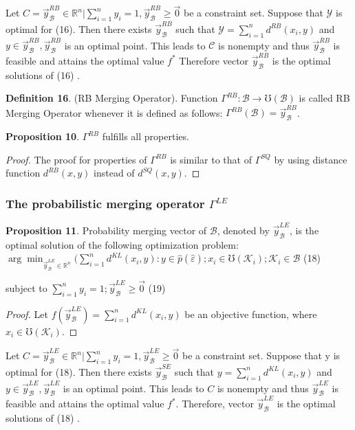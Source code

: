 \documentclass[]{iosart2c}
\begin{document}
  Let $C = { \vec{y}^{RB}_\mathcal{B} \in \mathbb{R}^n|\sum^n_{i=1} y_i = 1, \vec{y}^{RB}_\mathcal{B} \geq \vec{0} }$ be
  a constraint set. Suppose that $\mathcal{Y}$ is optimal for (16).
  Then there exists $\vec{y}^{RB}_\mathcal{B}$ such that $\mathcal{Y} = \sum^n_{i=1} d^{RB}(x_i, y)$
  and $y \in \vec{y}^{RB}_\mathcal{B} , \vec{y}^{RB}_\mathcal{B}$ is an optimal point. This leads to $\mathcal{C}$
  is nonempty and thus $\vec{y}^{RB}_\mathcal{B}$ is feasible and attains the
  optimal value $f^*$ Therefore vector $\vec{y}^{RB}_\mathcal{B}$ is the optimal
  solutions of (16) \cite{25}.

  \textbf{Definition 16}. (RB Merging Operator). Function
  $\Gamma^{RB} : \mathcal{B} \to \mho(\mathcal{B})$ is called RB Merging Operator
  whenever it is defined as follows: $\Gamma^{RB}(\mathcal{B}) = \vec{y}^{RB}_\mathcal{B}$.

  \textbf{Proposition 10}. $\Gamma^{RB}$ fulfills all properties.

  \begin{proof}
    The proof for properties of $\Gamma^{RB}$ is similar
    to that of $\Gamma^{SQ}$ by using distance function $d^{RB}(x, y)$
    instead of $d^{SQ}(x, y)$.
  \end{proof}

  \subsubsection{The probabilistic merging operator $\Gamma^{LE}$}

  \textbf{Proposition 11}. Probability merging vector of $\mathcal{B}$,
  denoted by $\vec{y}^{LE}_\mathcal{B}$, is the optimal solution of the following optimization problem:
  $\arg \min_{\vec{y}^{LE}_\mathcal{B} \in \mathbb{R}^n} (\sum^n_{i=1} d^{KL}(x_i, y) :
  y \in \hat{p}(\hat{\varepsilon}); x_i \in \mho(\mathcal{K}_i);\mathcal{K}_i \in \mathcal{B}$ (18)

  subject to $\sum^n_{i=1} y_i = 1; \vec{y}^{LE}_\mathcal{B} \geq \vec{0}$ (19)

  \begin{proof}
    Let $f(\vec{y}^{LE}_\mathcal{B} ) = \sum^n_{i=1} d^{KL}(x_i, y)$ be an objective function, where $x_i \in \mho(\mathcal{K}_i)$.
  \end{proof}

  Let $C = {\vec{y}^{LE}_\mathcal{B} \in \mathbb{R}^n|\sum^n_{i=1} y_i = 1, \vec{y}^{LE}_\mathcal{B} \geq \vec{0} }$ be a
  constraint set. Suppose that y is optimal for (18).
  Then there exists $\vec{y}^{SE}_\mathcal{B}$ such that $y = \sum^n_{i=1} d^{KL}(x_i, y)$
  and $y \in \vec{y}^{LE}_\mathcal{B} , \vec{y}^{LE}_\mathcal{B}$ is an optimal point. This leads to
  $C$ is nonempty and thus $\vec{y}^{LE}_\mathcal{B}$ is feasible and attains
  the optimal value $f^*$. Therefore, vector $\vec{y}^{LE}_\mathcal{B}$ is the
  optimal solutions of (18) \cite{25}.
\end{document}
